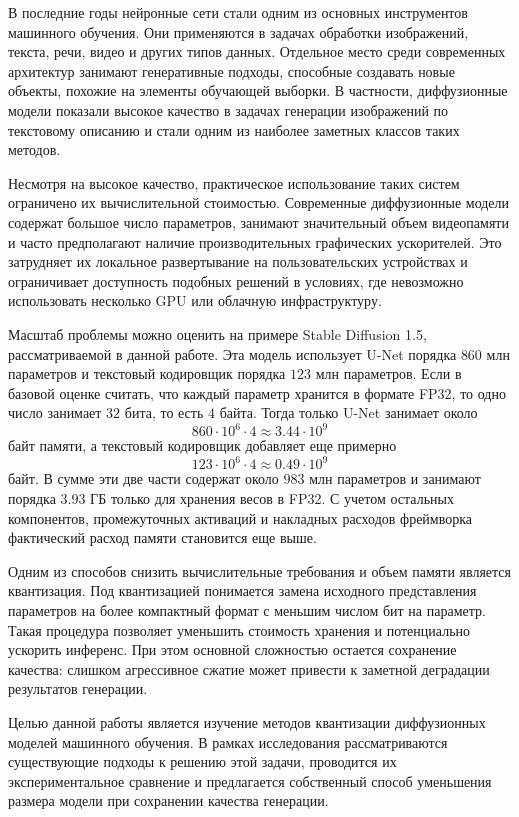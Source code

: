 \documentclass[a4paper,12pt]{article}
\begin{document}
В последние годы нейронные сети стали одним из основных инструментов машинного обучения. Они применяются в задачах обработки изображений, текста, речи, видео и других типов данных. Отдельное место среди современных архитектур занимают генеративные подходы, способные создавать новые объекты, похожие на элементы обучающей выборки. В частности, диффузионные модели показали высокое качество в задачах генерации изображений по текстовому описанию и стали одним из наиболее заметных классов таких методов.

Несмотря на высокое качество, практическое использование таких систем ограничено их вычислительной стоимостью. Современные диффузионные модели содержат большое число параметров, занимают значительный объем видеопамяти и часто предполагают наличие производительных графических ускорителей. Это затрудняет их локальное развертывание на пользовательских устройствах и ограничивает доступность подобных решений в условиях, где невозможно использовать несколько GPU или облачную инфраструктуру.

Масштаб проблемы можно оценить на примере Stable Diffusion 1.5, рассматриваемой в данной работе. Эта модель использует U-Net порядка $860$ млн параметров и текстовый кодировщик порядка $123$ млн параметров. Если в базовой оценке считать, что каждый параметр хранится в формате FP32, то одно число занимает $32$ бита, то есть $4$ байта. Тогда только U-Net занимает около
\[
    860 \cdot 10^6 \cdot 4 \approx 3.44 \cdot 10^9
\]
байт памяти, а текстовый кодировщик добавляет еще примерно
\[
    123 \cdot 10^6 \cdot 4 \approx 0.49 \cdot 10^9
\]
байт. В сумме эти две части содержат около $983$ млн параметров и занимают порядка $3.93$ ГБ только для хранения весов в FP32. С учетом остальных компонентов, промежуточных активаций и накладных расходов фреймворка фактический расход памяти становится еще выше.

Одним из способов снизить вычислительные требования и объем памяти является квантизация. Под квантизацией понимается замена исходного представления параметров на более компактный формат с меньшим числом бит на параметр. Такая процедура позволяет уменьшить стоимость хранения и потенциально ускорить инференс. При этом основной сложностью остается сохранение качества: слишком агрессивное сжатие может привести к заметной деградации результатов генерации.

Целью данной работы является изучение методов квантизации диффузионных моделей машинного обучения. В рамках исследования рассматриваются существующие подходы к решению этой задачи, проводится их экспериментальное сравнение и предлагается собственный способ уменьшения размера модели при сохранении качества генерации.
\end{document}
